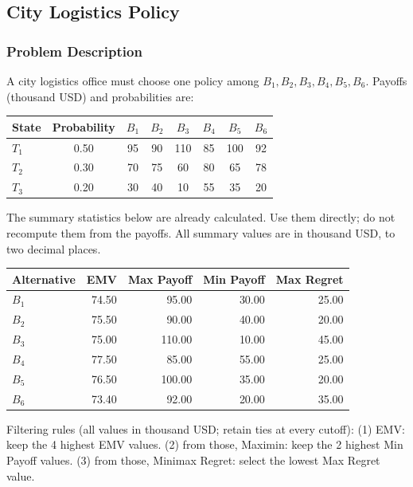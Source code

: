 \subsection{City Logistics Policy}\label{sec:c9-logistics}
\subsubsection*{Problem Description}
A city logistics office must choose one policy among $B_1,B_2,B_3,B_4,B_5,B_6$.
Payoffs (thousand USD) and probabilities are:
\begin{center}
	\begin{tabular}{l c c c c c c c}
		\toprule
		State & Probability & $B_1$ & $B_2$ & $B_3$ & $B_4$ & $B_5$ & $B_6$ \\
		\midrule
		$T_1$ & 0.50 & 95 & 90 & 110 & 85 & 100 & 92 \\
		$T_2$ & 0.30 & 70 & 75 & 60 & 80 & 65 & 78 \\
		$T_3$ & 0.20 & 30 & 40 & 10 & 55 & 35 & 20 \\
		\bottomrule
	\end{tabular}
\end{center}
The summary statistics below are already calculated. Use them directly; do not recompute them from the payoffs. All summary values are in thousand USD, to two decimal places.
\begin{center}
\begin{tabular}{lrrrr}
\toprule
Alternative & EMV & Max Payoff & Min Payoff & Max Regret \\
\midrule
$B_1$ & 74.50 & 95.00 & 30.00 & 25.00 \\
$B_2$ & 75.50 & 90.00 & 40.00 & 20.00 \\
$B_3$ & 75.00 & 110.00 & 10.00 & 45.00 \\
$B_4$ & 77.50 & 85.00 & 55.00 & 25.00 \\
$B_5$ & 76.50 & 100.00 & 35.00 & 20.00 \\
$B_6$ & 73.40 & 92.00 & 20.00 & 35.00 \\
\bottomrule
\end{tabular}
\end{center}
Filtering rules (all values in thousand USD; retain ties at every cutoff):
(1) EMV: keep the 4 highest EMV values.
(2) from those, Maximin: keep the 2 highest Min Payoff values.
(3) from those, Minimax Regret: select the lowest Max Regret value.


